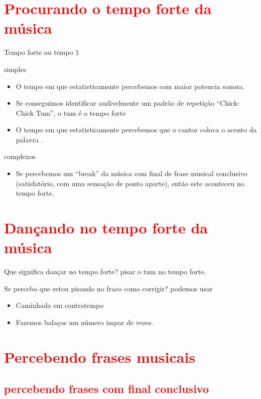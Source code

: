 \section{\textcolor{red}{Procurando o tempo forte da música}}
Tempo forte ou tempo 1

simples
\begin{itemize}
\item O tempo em que estatisticamente percebemos com maior potencia sonora. 
\item Se conseguimos identificar audivelmente um padrão de repetição ``Chick-Chick Tum'', o tum é o tempo forte
\item O tempo em que estatisticamente percebemos que o cantor  coloca o acento da palavra \cite[pp. 149]{medteoria}. 
\end{itemize}

complexos 
\begin{itemize}
\item Se percebemos um ``break'' da música com final de frase musical conclusivo 
(satisfatório, com uma sensação de ponto aparte), então este aconteceu no tempo forte.
\end{itemize}

\section{\textcolor{red}{Dançando no tempo forte da música}}

Que significa dançar no tempo forte? 
pisar o tum  no tempo forte.

Se percebo que estou pisando no fraco como corrigir?
podemos usar
\begin{itemize}
\item Caminhada em contratempo
\item Fazemos balaços um número impar de vezes.
\end{itemize}


\section{\textcolor{red}{Percebendo frases musicais}}

\subsection{\textcolor{red}{percebendo frases com final conclusivo}}

